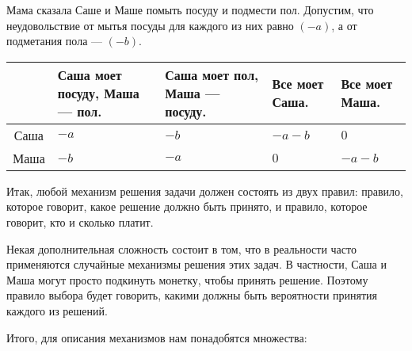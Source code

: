 \begin{myex} \label{sm_posuda} Мама сказала Саше и Маше помыть посуду и подмести пол. Допустим, что неудовольствие от мытья посуды для каждого из них равно $ (-a) $, а от подметания пола --- $ (-b) $.

\begin{tabular}{c|p{3 cm}p{3 cm}p{3 cm}p{3 cm}}
& Саша моет посуду, Маша --- пол. & Саша моет пол, Маша --- посуду. & Все моет Саша. & Все моет Маша. \\ 
\hline 
Саша & $ -a $ & $ -b $ & $ -a-b $ & $ 0 $ \\ 
Маша & $ -b $ & $ -a $ & $ 0 $ & $ -a-b $ \\ 
\end{tabular} 

\end{myex}


Итак, любой механизм решения задачи должен состоять из двух правил: правило, которое говорит, какое решение должно быть принято, и правило, которое говорит, кто и сколько платит.

Некая дополнительная сложность состоит в том, что в реальности часто применяются случайные механизмы решения этих задач. В частности, Саша и Маша могут просто подкинуть монетку, чтобы принять решение. Поэтому правило выбора будет говорить, какими должны быть вероятности принятия каждого из решений.

Итого, для описания механизмов нам понадобятся множества:


